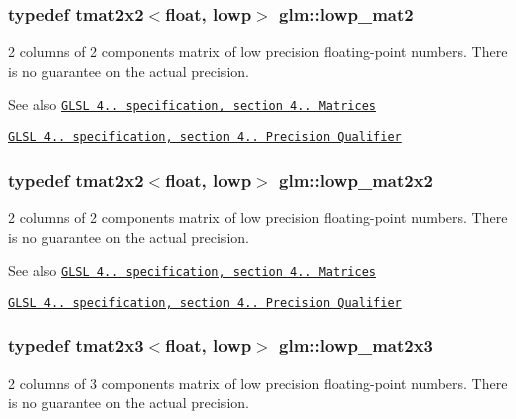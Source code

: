 \subsubsection[{lowp\+\_\+mat2}]{\setlength{\rightskip}{0pt plus 5cm}typedef tmat2x2$<$float, lowp$>$ {\bf glm\+::lowp\+\_\+mat2}}\label{namespaceglm_a4dcbb9d31820068d967a8a23086d360a}
2 columns of 2 components matrix of low precision floating-\/point numbers. There is no guarantee on the actual precision.

\begin{DoxySeeAlso}{See also}
\href{http://www.opengl.org/registry/doc/GLSLangSpec.4.20.8.pdf}{\tt G\+L\+S\+L 4.. specification, section 4.. Matrices} 

\href{http://www.opengl.org/registry/doc/GLSLangSpec.4.20.8.pdf}{\tt G\+L\+S\+L 4.. specification, section 4.. Precision Qualifier} 
\end{DoxySeeAlso}
\hypertarget{namespaceglm_a0aa7aecd379954a906b6264cb4ffb788}{}
\subsubsection[{lowp\+\_\+mat2x2}]{\setlength{\rightskip}{0pt plus 5cm}typedef tmat2x2$<$float, lowp$>$ {\bf glm\+::lowp\+\_\+mat2x2}}\label{namespaceglm_a0aa7aecd379954a906b6264cb4ffb788}
2 columns of 2 components matrix of low precision floating-\/point numbers. There is no guarantee on the actual precision.

\begin{DoxySeeAlso}{See also}
\href{http://www.opengl.org/registry/doc/GLSLangSpec.4.20.8.pdf}{\tt G\+L\+S\+L 4.. specification, section 4.. Matrices} 

\href{http://www.opengl.org/registry/doc/GLSLangSpec.4.20.8.pdf}{\tt G\+L\+S\+L 4.. specification, section 4.. Precision Qualifier} 
\end{DoxySeeAlso}
\hypertarget{namespaceglm_ad67cb8aff109d9873b8a96f2725bafe1}{}
\subsubsection[{lowp\+\_\+mat2x3}]{\setlength{\rightskip}{0pt plus 5cm}typedef tmat2x3$<$float, lowp$>$ {\bf glm\+::lowp\+\_\+mat2x3}}\label{namespaceglm_ad67cb8aff109d9873b8a96f2725bafe1}
2 columns of 3 components matrix of low precision floating-\/point numbers. There is no guarantee on the actual precision.

